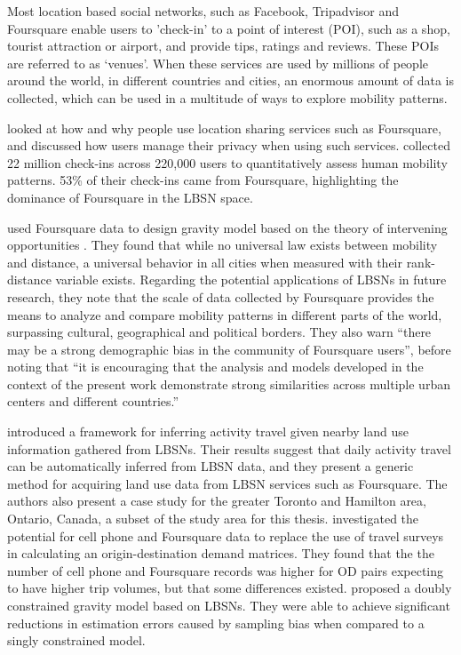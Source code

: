 Most location based social networks, such as Facebook, Tripadvisor and Foursquare enable users to 'check-in' to a point of interest (POI), such as a shop, tourist attraction or airport, and provide tips, ratings and reviews. These POIs are referred to as `venues'. When these services are used by millions of people around the world, in different countries and cities, an enormous amount of data is collected, which can be used in a multitude of ways to explore mobility patterns. 

\textcite{lindqvist2011m} looked at how and why people use location sharing services such as Foursquare, and discussed how users manage their privacy when using such services. \autocite{cheng2011exploring} collected 22 million check-ins across 220,000 users to quantitatively assess human mobility patterns. 53\% of their check-ins came from Foursquare, highlighting the dominance of Foursquare in the LBSN space.

\textcite{noulas2012tale} used Foursquare data to design gravity model based on the theory of intervening opportunities \parencite{stouffer1940intervening}. They found that while no universal law exists between mobility and distance, a universal behavior in all cities when measured with their rank-distance variable exists. Regarding the potential applications of LBSNs in future research, they note that the scale of data collected by Foursquare provides the means to analyze and compare mobility patterns in different parts of the world, surpassing cultural, geographical and political borders. They also warn \enquote{there may be a strong demographic bias in the community of Foursquare users}, before noting that \enquote{it is encouraging that the analysis and models developed in the context of the present work demonstrate strong similarities across multiple urban centers and different countries.}

\textcite{abdulazim2015framework} introduced a framework for inferring activity travel given nearby land use information gathered from LBSNs. Their results suggest that daily activity travel can be automatically inferred from LBSN data, and they present a generic method for acquiring land use data from LBSN services such as Foursquare. The authors also present a case study for the  greater Toronto and Hamilton area, Ontario, Canada, a subset of the study area for this thesis. \textcite{sa2015origin} investigated the potential for cell phone and Foursquare data to replace the use of travel surveys in calculating an origin-destination demand matrices. They found that the the number of cell phone and Foursquare records was higher for OD pairs expecting to have higher trip volumes, but that some differences existed.
\textcite{jin2014location} proposed a doubly constrained gravity model based on LBSNs. They were able to achieve significant reductions in estimation errors caused by sampling bias when compared to a singly constrained model.

